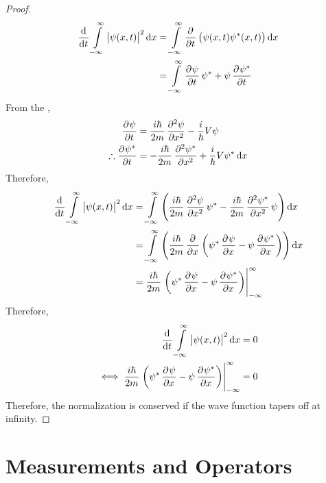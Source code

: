 \documentclass[titlepage, fleqn, a4paper, 12pt, twoside]{article}
\theoremstyle{definition}
\theoremstyle{theorem}
\let\Oldsection\section
\renewcommand{\section}{\FloatBarrier\Oldsection}
\begin{document}
\begin{proof}
	\begin{align*}
		\dod{}{t} \int\limits_{-\infty}^{\infty} \left| \psi(x,t) \right|^2 \dif x & = \int\limits_{-\infty}^{\infty} \dpd{}{t} \left( \psi(x,t) \psi^*(x,t) \right) \dif x \\
                                                                                           & = \int\limits_{-\infty}^{\infty} \dpd{\psi}{t} \psi^* + \psi \dpd{\psi^*}{t}
	\end{align*}
	From the ,
	\begin{align*}
		\dpd{\psi}{t}              & = \frac{i \hbar}{2 m} \dpd[2]{\psi}{x} - \frac{i}{\hbar} V \psi \\
		\therefore \dpd{\psi^*}{t} & = -\frac{i \hbar}{2 m} \dpd[2]{\psi^*}{x} + \frac{i}{\hbar} V \psi^* \dif x
	\end{align*}
	Therefore,
	\begin{align*}
		\dod{}{t} \int\limits_{-\infty}^{\infty} \left| \psi(x,t) \right|^2 \dif x & = \int\limits_{-\infty}^{\infty} \left( \frac{i \hbar}{2 m} \dpd[2]{\psi}{x} \psi^* - \frac{i \hbar}{2 m} \dpd[2]{\psi^*}{x} \psi \right) \dif x \\
                                                                                           & = \int\limits_{-\infty}^{\infty} \left( \frac{i \hbar}{2 m} \dpd{}{x}\left( \psi^* \dpd{\psi}{x} - \psi \dpd{\psi^*}{x} \right) \right) \dif x   \\
                                                                                           & = \frac{i \hbar}{2 m} \left. \left( \psi^* \dpd{\psi}{x} - \psi \dpd{\psi^*}{x} \right) \right|_{-\infty}^{\infty}
	\end{align*}
	Therefore,
	\begin{align*}
		\dod{}{t} \int\limits_{-\infty}^{\infty} \left| \psi(x,t) \right|^2 \dif x                                            & = 0 \\
		\iff \frac{i \hbar}{2 m} \left. \left( \psi^* \dpd{\psi}{x} - \psi \dpd{\psi^*}{x} \right) \right|_{-\infty}^{\infty} & = 0
	\end{align*}
	Therefore, the normalization is conserved if the wave function tapers off at infinity.
\end{proof}

\section{Measurements and Operators}
\end{document}
